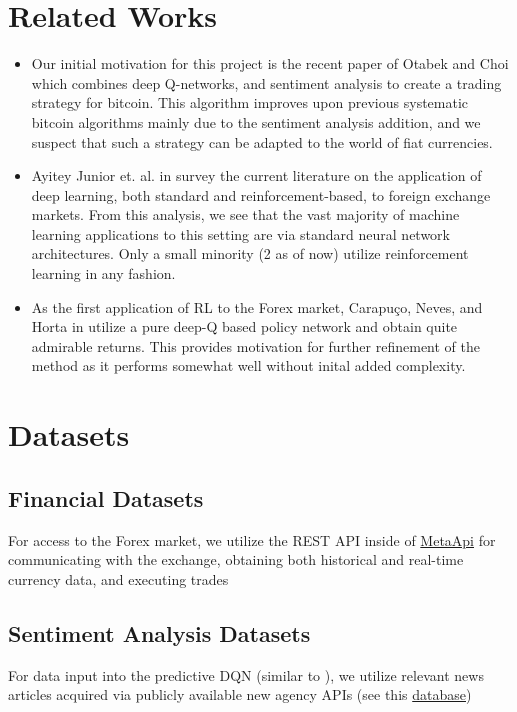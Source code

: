 \documentclass{article}
\begin{document}
\section{Related Works}

\begin{itemize}
    \item Our initial motivation for this project is the recent paper of Otabek and Choi \cite{otabek:24} which combines deep Q-networks, and sentiment analysis to create a trading strategy for bitcoin. This algorithm improves upon previous systematic bitcoin algorithms mainly due to the sentiment analysis addition, and we suspect that such a strategy can be adapted to the world of fiat currencies.
    \item Ayitey Junior et. al. in \cite{ayitey:23} survey the current literature on the application of deep learning, both standard and reinforcement-based, to foreign exchange markets. From this analysis, we see that the vast majority of machine learning applications to this setting are via standard neural network architectures. Only a small minority (2 as of now) utilize reinforcement learning in any fashion. 
    \item As the first application of RL to the Forex market, Carapuço, Neves, and Horta in \cite{carapuco:18} utilize a pure deep-Q based policy network and obtain quite admirable returns. This provides motivation for further refinement of the method as it performs somewhat well without inital added complexity.
\end{itemize}


\section{Datasets}
\subsection{Financial Datasets}
For access to the Forex market, we utilize the REST API inside of \href{https://metaapi.cloud/docs/client/}{MetaApi} for communicating with the exchange, obtaining both historical and real-time currency data, and executing trades

\subsection{Sentiment Analysis Datasets}
For data input into the predictive DQN (similar to \cite{otabek:24}), we utilize relevant news articles acquired via publicly available new agency APIs (see this \href{https://free-apis.github.io/#/categories/News}{database})
\end{document}
